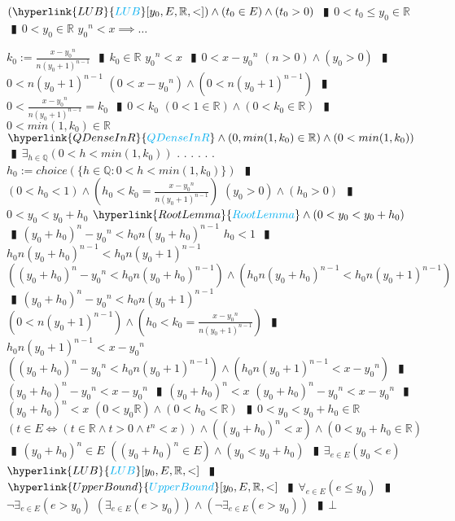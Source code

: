 \documentclass{book}
\newcommand{\rf}[1]{\hyperlink{#1}{\textcolor{cyan}{#1}}}
\newcommand{\abr}{:=}
\newcommand{\cont}{\phantom{.}. . .\phantom{.}}
\newcommand{\pipe}{$\phantom{(}\vrectangleblack\phantom{)}$}
\newcommand{\pr}[1]{\left(#1\right)}
\begin{document}
\begin{enumerate}
\begin{enumerate}
    \lit $(\rf{LUB}[y_0, E, \mathbb{R}, <]) \land (t_0 \in E) \land (t_0 > 0)$ \pipe $0 < t_0 \leq y_0 \in \mathbb{R}$ \pipe $0 < y_0 \in \mathbb{R}$
    \lit ${y_0}^n < x \implies \ldots$
    \begin{enumerate}
      \lit $k_0 \abr \frac{x - {y_0}^n}{n (y_0 + 1)^{n - 1}}$ \pipe $k_0 \in \mathbb{R}$
      \lit ${y_0}^n < x$ \pipe $0 < x - {y_0}^n$
      \lit $(n > 0) \land (y_0 > 0)$ \pipe $0 < n (y_0 + 1)^{n - 1}$
      \lit $(0 < x - {y_0}^n) \land \pr{0 < n (y_0 + 1)^{n - 1}}$ \pipe $0 < \frac{x - {y_0}^n}{n (y_0 + 1)^{n - 1}} = k_0$ \pipe $0 < k_0$
      \lit $(0 < 1 \in \mathbb{R}) \land (0 < k_0 \in \mathbb{R})$ \pipe $0 < min(1, k_0) \in \mathbb{R}$ 
      \lit $\rf{QDenseInR} \land \pr{0, min(1, k_0) \in \mathbb{R}} \land \pr{0 < min(1, k_0)}$ \pipe $\exists_{h \in \mathbb{Q}}\pr{0 < h < min(1, k_0)}$ \cont
      \lit \cont $h_0 \abr choice\pr{\{h \in \mathbb{Q} : 0 < h < min(1, k_0)\}}$ \pipe $(0 < h_0 < 1) \land \pr{h_0 < k_0 = \frac{x - {y_0}^n}{n (y_0 + 1)^{n - 1}}}$
      \lit $(y_0 > 0) \land (h_0 > 0)$ \pipe $0 < y_0 < y_0 + h_0$
      \lit $\rf{RootLemma} \land (0 < y_0 < y_0 + h_0)$ \pipe $(y_0 + h_0)^n - {y_0}^n < h_0 n (y_0 + h_0)^{n - 1}$
      \lit $h_0 < 1$ \pipe $h_0 n (y_0 + h_0)^{n - 1} < h_0 n (y_0 + 1)^{n - 1}$
      \lit $\pr{(y_0 + h_0)^n - {y_0}^n < h_0 n (y_0 + h_0)^{n - 1}} \land \pr{h_0 n (y_0 + h_0)^{n - 1} < h_0 n (y_0 + 1)^{n - 1}}$ \pipe $(y_0 + h_0)^n - {y_0}^n < h_0 n (y_0 + 1)^{n - 1}$
      \lit $\pr{0 < n (y_0 + 1)^{n - 1}} \land \pr{h_0 < k_0 = \frac{x - {y_0}^n}{n (y_0 + 1)^{n - 1}}}$ \pipe $h_0 n (y_0 + 1)^{n - 1} < x - {y_0}^n$
      \lit $\pr{(y_0 + h_0)^n - {y_0}^n < h_0 n (y_0 + 1)^{n - 1}} \land \pr{h_0 n (y_0 + 1)^{n - 1} < x - {y_0}^n}$ \pipe $(y_0 + h_0)^n - {y_0}^n < x - {y_0}^n$ \pipe $(y_0 + h_0)^n < x$
      \lit $(y_0 + h_0)^n - {y_0}^n < x - {y_0}^n$ \pipe $(y_0 + h_0)^n < x$
      \lit $(0 < y_0 \mathbb{R}) \land (0 < h_0 < \mathbb{R})$ \pipe $0 < y_0 < y_0 + h_0 \in \mathbb{R}$
      \lit $\pr{t \in E \iff (t \in \mathbb{R} \land t > 0 \land t^n < x)} \land \pr{(y_0 + h_0)^n < x} \land (0 < y_0 + h_0 \in \mathbb{R})$ \pipe $(y_0 + h_0)^n \in E$
      \lit $\pr{(y_0 + h_0)^n \in E} \land (y_0 < y_0 + h_0)$ \pipe $\exists_{e \in E}(y_0 < e)$
      \lit $\rf{LUB}[y_0, E, \mathbb{R}, <]$ \pipe $\rf{UpperBound}[y_0, E, \mathbb{R}, <]$ \pipe $\forall_{e \in E}(e \leq y_0)$ \pipe $\lnot \exists_{e \in E}(e > y_0)$
      \lit $\pr{\exists_{e \in E}(e > y_0)} \land \pr{\lnot \exists_{e \in E}(e > y_0)}$ \pipe $\bot$
    \end{enumerate}

\end{enumerate}
\end{enumerate}
\end{document}
